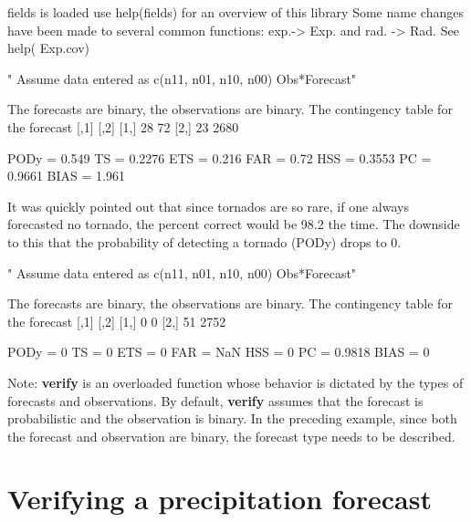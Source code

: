 \documentclass{article}
\begin{document}
\begin{Schunk}
\begin{Soutput}
fields is loaded use help(fields) for an overview of this library  
  Some name changes have been made to several common functions: 
  exp.-> Exp. and rad. -> Rad. See help( Exp.cov)
\end{Soutput}
\begin{Soutput}
[1] " Assume data entered as c(n11, n01, n10, n00) Obs*Forecast"
\end{Soutput}
\begin{Soutput}
The forecasts are binary, the observations are binary.
The contingency table for the forecast 
     [,1] [,2]
[1,]   28   72
[2,]   23 2680

PODy =  0.549 
TS   =  0.2276 
ETS  =  0.216 
FAR  =   0.72 
HSS  =  0.3553 
PC   =  0.9661 
BIAS =  1.961 
\end{Soutput}
\end{Schunk}

It was quickly pointed out that since tornados are so rare, if one
always forecasted no tornado, the percent correct would be  98.2%
the time.  The downside to this that the probability of detecting a
tornado (PODy) drops to 0.

\begin{Schunk}
\begin{Soutput}
[1] " Assume data entered as c(n11, n01, n10, n00) Obs*Forecast"
\end{Soutput}
\begin{Soutput}
The forecasts are binary, the observations are binary.
The contingency table for the forecast 
     [,1] [,2]
[1,]    0    0
[2,]   51 2752

PODy =      0 
TS   =      0 
ETS  =      0 
FAR  =    NaN 
HSS  =      0 
PC   =  0.9818 
BIAS =      0 
\end{Soutput}
\end{Schunk}

Note: \textbf{verify} is an overloaded function
whose behavior is dictated by the types of forecasts and
observations.  By default, \textbf{verify} assumes that the forecast is
probabilistic and the observation is binary.  In the preceding
example, since both the forecast and observation are binary, the
forecast type needs to be described.
  
\section{Verifying a precipitation forecast} 
\end{document}
